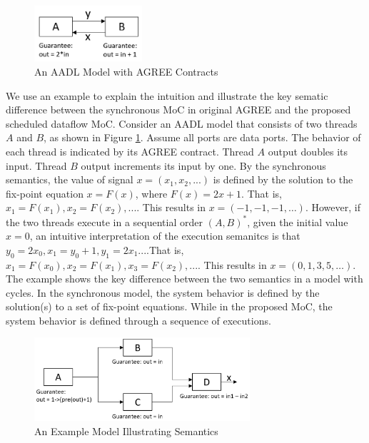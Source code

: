 \begin{figure}[ht!]
\centering
\includegraphics[width=40mm]{example1.jpg}
\caption{An AADL Model with AGREE Contracts\label{motivationFig1}}
\end{figure}

We use an example to explain the intuition and illustrate the key sematic difference between the synchronous MoC in original AGREE and the proposed scheduled dataflow MoC.
Consider an AADL model that consists of two threads $A$ and $B$, as shown in Figure \ref{motivationFig1}. Assume all ports are data ports. The behavior of each thread is indicated by its AGREE contract. Thread $A$ output doubles its input. Thread $B$ output increments its input by one. By the synchronous semantics, the value of signal $x = (x_1, x_2, ...)$ is defined by the solution to the fix-point equation $x = F(x)$, where $F(x) = 2x + 1$. That is, $x_1 = F(x_1), x_2 = F(x_2),...$. This results in $x = (-1, -1, -1,…)$. However, if the two threads execute in a sequential order $(A,B)^*$, given the initial value $x = 0$, an intuitive interpretation of the execution semanitcs is that $y_0 = 2x_0, x_1 = y_0+1, y_1 = 2x_1...$.That is, $x_1 = F(x_0), x_2 = F(x_1), x_3 = F(x_2),...$. This results in $x = (0, 1, 3, 5,…)$. The example shows the key difference between the two semantics in a model with cycles. In the synchronous model, the system behavior is defined by the solution(s) to a set of fix-point equations. While in the proposed MoC, the system behavior is defined through a sequence of executions.

\begin{figure}[ht!]
\centering
\includegraphics[width=80mm]{motivationalexample1.jpg}
\caption{An Example Model Illustrating Semantics\label{motivationFig2}}
\end{figure}

